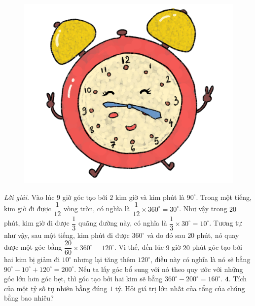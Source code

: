 \begin{multicols}{2}
	\begin{figure}[H]
		\centering
		\vspace*{5pt}
		\captionsetup{labelformat= empty, justification=centering}
		\includegraphics[width=1\linewidth]{bai3}
		\vspace*{-15pt}
	\end{figure}
	\textit{Lời giải.} 	Vào lúc $9$ giờ góc tạo bởi $2$ kim giờ và kim phút là $90^\circ$. Trong một tiếng, kim giờ đi được $\dfrac{1}{12}$ vòng tròn, có nghĩa là $\dfrac{1}{12}\times 360^\circ = 30^\circ$. Như vậy trong $20$ phút, kim giờ đi được $\dfrac{1}{3}$ quãng đường này, có nghĩa là $\dfrac{1}{3}\times 30^\circ=10^\circ$. Tương tự như vậy, sau một tiếng, kim phút đi được $360^\circ$ và do đó sau $20$ phút, nó quay được một góc bằng $\dfrac{20}{60}\times 360^\circ=120^\circ$. Vì thế, đến lúc $9$ giờ $20$ phút góc tạo bởi hai kim bị giảm đi $10^\circ$ nhưng lại tăng thêm $120^\circ$, điều này có nghĩa là nó sẽ bằng $90^\circ-10^\circ+120^\circ=200^\circ$. Nếu ta lấy góc bổ sung với nó theo quy ước với những góc lớn hơn góc bẹt, thì góc tạo bởi hai kim sẽ bằng $360^\circ-200^\circ=160^\circ$.
	\vskip 0.1cm
	$\pmb{4.}$ Tích của một tỷ số tự nhiên bằng đúng $1$ tỷ. Hỏi giá trị lớn nhất của tổng của chúng bằng bao nhiêu?
	\begin{figure}[H]
		\centering
		\vspace*{-5pt}
		\captionsetup{labelformat= empty, justification=centering}

\end{figure}
\end{multicols}
